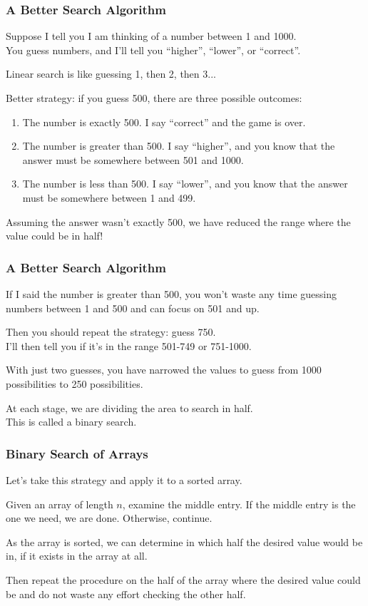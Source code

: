 \begin{frame}
\frametitle{A Better Search Algorithm}

Suppose I tell you I am thinking of a number between 1 and 1000.\\
\quad You guess numbers, and I'll tell you ``higher'', ``lower'', or ``correct''.

Linear search is like guessing 1, then 2, then 3...

Better strategy: if you guess 500, there are three possible outcomes:
\begin{enumerate}
	\item The number is exactly 500. I say ``correct'' and the game is over.
	\item The number is greater than 500. I say ``higher'', and you know that the answer must be somewhere between 501 and 1000.
	\item The number is less than 500. I say ``lower'', and you know that the answer must be somewhere between 1 and 499.
\end{enumerate}

Assuming the answer wasn't exactly 500, we have reduced the range where the value could be in half!

\end{frame}

\begin{frame}
\frametitle{A Better Search Algorithm}

If I said the number is greater than 500, you won't waste any time guessing numbers between 1 and 500 and can focus on 501 and up.

Then you should repeat the strategy: guess 750.\\
\quad I'll then tell you if it's in the range 501-749 or 751-1000.

With just two guesses, you have narrowed the values to guess from 1000 possibilities to 250 possibilities.

At each stage, we are dividing the area to search in half.\\
\quad This is called a \alert{binary search}.

\end{frame}

\begin{frame}
\frametitle{Binary Search of Arrays}

Let's take this strategy and apply it to a sorted array.

Given an array of length $n$, examine the middle entry. If the middle entry is the one we need, we are done. Otherwise, continue.

As the array is sorted, we can determine in which half the desired value would be in, if it exists in the array at all.

Then repeat the procedure on the half of the array where the desired value could be and do not waste any effort checking the other half.

\end{frame}


